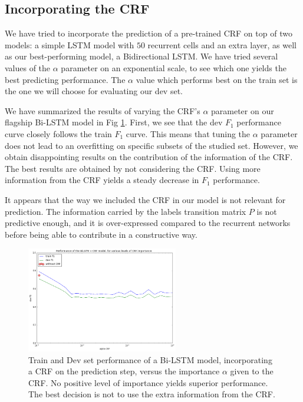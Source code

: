 \documentclass{article} %
\begin{document}
\subsection{Incorporating the CRF}

We have tried to incorporate the prediction of a pre-trained CRF on top of two models: a simple LSTM model with $50$ recurrent cells and an extra layer, as well as our best-performing model, a Bidirectional LSTM. We have tried several values of the $\alpha$ parameter on an exponential scale, to see which one yields the best predicting performance. The $\alpha$ value which performs best on the train set is the one we will choose for evaluating our dev set.

We have summarized the results of varying the CRF's $\alpha$ parameter on our flagship Bi-LSTM model in Fig \ref{lstm-crf-results}. First, we see that the dev $F_1$ performance curve closely follows the  train $F_1$ curve. This means that tuning the $\alpha$ parameter does not lead to an overfitting on specific subsets of the studied set. However, we obtain disappointing results on the contribution of the information of the CRF. The best results are obtained by not considering the CRF. Using more information from the CRF yields a steady decrease in $F_1$ performance.

It appears that the way we included the CRF in our model is not relevant for prediction. The information carried by the labels transition matrix $P$ is not predictive enough, and it is over-expressed compared to the recurrent networks before being able to contribute in a constructive way.

\begin{figure}[h!]
\begin{center}
\includegraphics[width=250px]{figs/BiLSTM-CRF-vs-alpha.png}
\caption{Train and Dev set performance of a Bi-LSTM model, incorporating a CRF on the prediction step, versus the importance $\alpha$ given to the CRF. No positive level of importance yields superior performance. The best decision is not to use the extra information from the CRF. }
\label{lstm-crf-results}
\end{center}
\end{figure}
\end{document}
